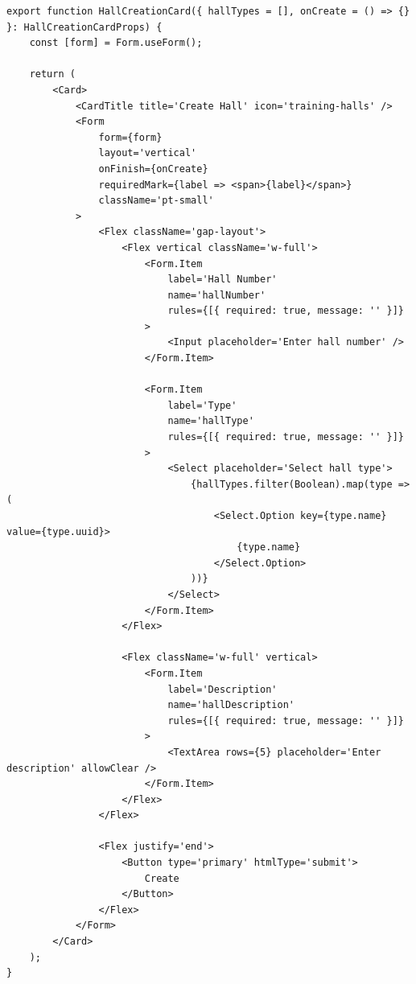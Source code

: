 \documentclass[../../spr.tex]{subfiles}
\begin{document}
\begin{lstlisting}[caption=Przykład obsługi formularza. Wykorzystywany jest \textit{hook useForm} z \textit{Ant Design} który pozwala na łatwą walidację i przesyłanie wartości z formularza.]
export function HallCreationCard({ hallTypes = [], onCreate = () => {} }: HallCreationCardProps) {
    const [form] = Form.useForm();

    return (
        <Card>
            <CardTitle title='Create Hall' icon='training-halls' />
            <Form
                form={form}
                layout='vertical'
                onFinish={onCreate}
                requiredMark={label => <span>{label}</span>}
                className='pt-small'
            >
                <Flex className='gap-layout'>
                    <Flex vertical className='w-full'>
                        <Form.Item
                            label='Hall Number'
                            name='hallNumber'
                            rules={[{ required: true, message: '' }]}
                        >
                            <Input placeholder='Enter hall number' />
                        </Form.Item>

                        <Form.Item
                            label='Type'
                            name='hallType'
                            rules={[{ required: true, message: '' }]}
                        >
                            <Select placeholder='Select hall type'>
                                {hallTypes.filter(Boolean).map(type => (
                                    <Select.Option key={type.name} value={type.uuid}>
                                        {type.name}
                                    </Select.Option>
                                ))}
                            </Select>
                        </Form.Item>
                    </Flex>

                    <Flex className='w-full' vertical>
                        <Form.Item
                            label='Description'
                            name='hallDescription'
                            rules={[{ required: true, message: '' }]}
                        >
                            <TextArea rows={5} placeholder='Enter description' allowClear />
                        </Form.Item>
                    </Flex>
                </Flex>

                <Flex justify='end'>
                    <Button type='primary' htmlType='submit'>
                        Create
                    </Button>
                </Flex>
            </Form>
        </Card>
    );
}
\end{lstlisting}
\end{document}
